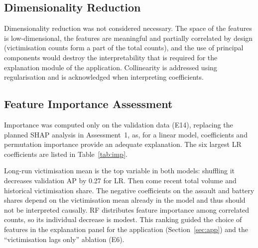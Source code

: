 \documentclass[11pt,a4paper]{report}
\begin{document}
\subsection{Dimensionality Reduction}
Dimensionality reduction was not considered necessary. The space of the features is low-dimensional, the features are meaningful and partially correlated by design (victimisation counts form a part of the total counts), and the use of principal components would destroy the interpretability that is required for the explanation module of the application. Collinearity is addressed using regularisation and is acknowledged when interpreting coefficients.

\subsection{Feature Importance Assessment}
\label{sec:importance}
Importance was computed only on the validation data (E14), replacing the planned SHAP analysis in Assessment~1, as, for a linear model, coefficients and permutation importance provide an adequate explanation. The six largest LR coefficients are listed in Table~\ref{tab:imp}.

\begin{table}[H]
\centering\small
\caption{Phase~2 feature importance on validation periods 9--10 (E14)}
\label{tab:imp}
\end{table}
Long-run victimisation mean is the top variable in both models: shuffling it decreases validation AP by 0.27 for LR. Then come recent total volume and historical victimisation share. The negative coefficients on the assault and battery shares depend on the victimisation mean already in the model and thus should not be interpreted causally. RF distributes feature importance among correlated counts, so its individual decrease is modest. This ranking guided the choice of features in the explanation panel for the application (Section~\ref{sec:app}) and the ``victimisation lags only'' ablation (E6).
\end{document}
